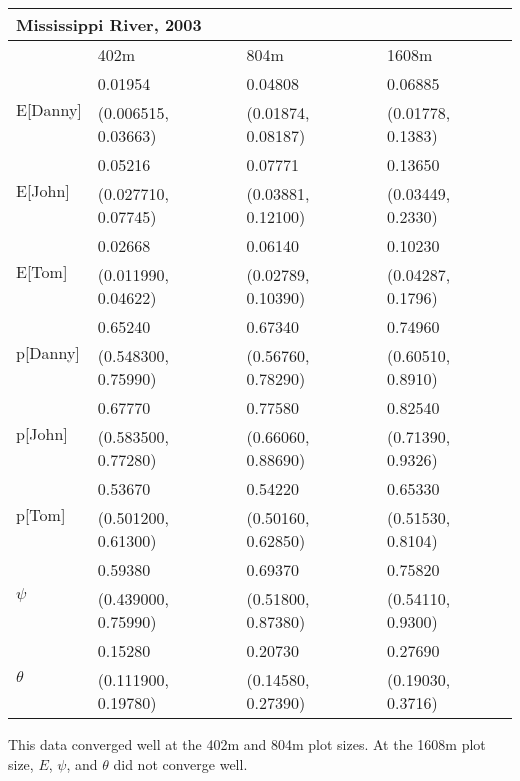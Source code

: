\documentclass{article}
\begin{document}
    \begin{center}
    \begin{tabular}{|l|l|l|l|}
        \hline
        \multicolumn{4}{|l|}{\textbf{Mississippi River, 2003}} \\
        \hline
            & 402m & 804m & 1608m \\
        \hline
        \multirow{2}{*}{E[Danny]}
            & 0.01954 & 0.04808 & 0.06885 \\
            & (0.006515, 0.03663) & (0.01874, 0.08187) & (0.01778, 0.1383) \\
        \hline
        \multirow{2}{*}{E[John]}
            & 0.05216 & 0.07771 & 0.13650 \\
            & (0.027710, 0.07745) & (0.03881, 0.12100) & (0.03449, 0.2330) \\
        \hline
        \multirow{2}{*}{E[Tom]}
            & 0.02668 & 0.06140 & 0.10230 \\
            & (0.011990, 0.04622) & (0.02789, 0.10390) & (0.04287, 0.1796) \\
        \hline
        \multirow{2}{*}{p[Danny]}
            & 0.65240 & 0.67340 & 0.74960 \\
            & (0.548300, 0.75990) & (0.56760, 0.78290) & (0.60510, 0.8910) \\
        \hline
        \multirow{2}{*}{p[John]}
            & 0.67770 & 0.77580 & 0.82540 \\
            & (0.583500, 0.77280) & (0.66060, 0.88690) & (0.71390, 0.9326) \\
        \hline
        \multirow{2}{*}{p[Tom]}
            & 0.53670 & 0.54220 & 0.65330 \\
            & (0.501200, 0.61300) & (0.50160, 0.62850) & (0.51530, 0.8104) \\
        \hline
        \multirow{2}{*}{\(\psi\)}
            & 0.59380 & 0.69370 & 0.75820 \\
            & (0.439000, 0.75990) & (0.51800, 0.87380) & (0.54110, 0.9300) \\
        \hline
        \multirow{2}{*}{\(\theta\)}
            & 0.15280 & 0.20730 & 0.27690 \\
            & (0.111900, 0.19780) & (0.14580, 0.27390) & (0.19030, 0.3716) \\
        \hline
    \end{tabular}
    \end{center}
    
    This data converged well at the 402m and 804m plot sizes.  At the 1608m plot
    size, \(E\), \(\psi\), and \(\theta\) did not converge well.
\end{document}
